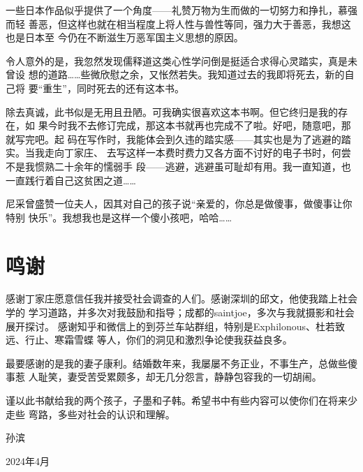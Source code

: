 一些日本作品似乎提供了一个角度——礼赞万物为生而做的一切努力和挣扎，慕强而轻
善恶，但这样也就在相当程度上将人性与兽性等同，强力大于善恶，我想这也是日本至
今仍在不断滋生万恶军国主义思想的原因。

令人意外的是，我忽然发现儒释道这类心性学问倒是挺适合求得心灵踏实，真是未曾设
想的道路……些微欣慰之余，又怅然若失。我知道过去的我即将死去，新的自己将
要“重生”，同时死去的还有这本书。

除去真诚，此书似是无用且丑陋。可我确实很喜欢这本书啊。但它终归是我的存在，如
果今时我不去修订完成，那这本书就再也完成不了啦。好吧，随意吧，那就写完吧。起
码在写作时，我能体会到久违的踏实感——其实也是为了逃避的踏实。当我走向丁家庄、
去写这样一本费时费力又各方面不讨好的电子书时，何尝不是我惯熟二十余年的懦弱手
段——逃避，逃避虽可耻却有用。我一直知道，也一直践行着自己这贫困之道……


尼采曾盛赞一位夫人，因其对自己的孩子说“亲爱的，你总是做傻事，做傻事让你特别
快乐”。我想我也是这样一个傻小孩吧，哈哈……

\section*{鸣谢}

感谢丁家庄愿意信任我并接受社会调查的人们。感谢深圳的邱文，他使我踏上社会学的
学习道路，并多次对我鼓励和指导；成都的saintjoe，多次与我就摄影和社会展开探讨。
感谢知乎和微信上的到芬兰车站群组，特别是Exphilonous、杜若致远、行止、寒霜雪蝶
等人，你们的洞见和激烈争论使我获益良多。


最要感谢的是我的妻子康利。结婚数年来，我屡屡不务正业，不事生产，总做些傻事惹
人耻笑，妻受苦受累颇多，却无几分怨言，静静包容我的一切胡闹。

谨以此书献给我的两个孩子，子墨和子韩。希望书中有些内容可以使你们在将来少走些
弯路，多些对社会的认识和理解。

{\raggedleft

孙滨 \qquad\qquad

2024年4月 \quad}




